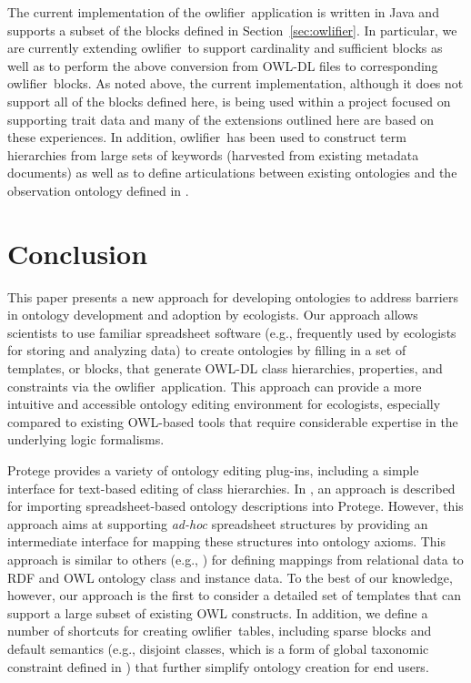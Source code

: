 \documentclass[5p,authoryear]{elsarticle}
\newcommand{\owlifier}{\textsf{owlifier}}
\newcommand{\secref}[1]{Section~\ref{#1}}
\begin{document}
The current implementation of the \owlifier\ application is written in
Java and supports a subset of the blocks defined in
\secref{sec:owlifier}. In particular, we are currently extending
\owlifier\ to support cardinality and sufficient blocks as well as to
perform the above conversion from OWL-DL files to corresponding
\owlifier\ blocks. As noted above, the current implementation,
although it does not support all of the blocks defined here, is being
used within a project focused on supporting trait data and many of the
extensions outlined here are based on these experiences. In addition,
\owlifier\ has been used to construct term hierarchies from large sets
of keywords (harvested from existing metadata documents) as well as to
define articulations between existing ontologies and the observation
ontology defined in \cite{madin07:_ontol_for_descr_and_synth}.


\section{Conclusion}
\label{sec:conclusion}

This paper presents a new approach for developing ontologies to
address barriers in ontology development and adoption by
ecologists. Our approach allows scientists to use familiar spreadsheet
software (e.g., frequently used by ecologists for storing and
analyzing data) to create ontologies by filling in a set of templates,
or blocks, that generate OWL-DL class hierarchies, properties, and
constraints via the \owlifier\ application.  This approach can provide
a more intuitive and accessible ontology editing environment for
ecologists, especially compared to existing OWL-based tools that
require considerable expertise in the underlying logic formalisms.

Protege provides a variety of ontology editing plug-ins, including a
simple interface for text-based editing of class hierarchies. In
\cite{kola07:_impor_spread_data_into_proteg}, an approach is described
for importing spreadsheet-based ontology descriptions into
Protege. However, this approach aims at supporting \emph{ad-hoc}
spreadsheet structures by providing an intermediate interface for
mapping these structures into ontology axioms. This approach is
similar to others (e.g.,
\cite{han08:_rdf12,bizer03:_d2r_map,an06:_discov_seman_of_relat_tables_throug_mappin})
for defining mappings from relational data to RDF and OWL ontology
class and instance data. To the best of our knowledge, however, our
approach is the first to consider a detailed set of templates that can
support a large subset of existing OWL constructs. In addition, we
define a number of shortcuts for creating \owlifier\ tables, including
sparse blocks and default semantics (e.g., disjoint classes, which is
a form of global taxonomic constraint defined in
\cite{thau07:_reason_about_taxon_in_first_order_logi}) that further
simplify ontology creation for end users.
\end{document}
